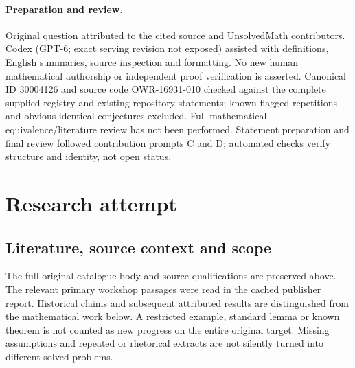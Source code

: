 \documentclass[11pt]{article}
\begin{document}
\paragraph{Preparation and review.}
Original question attributed to the cited source and UnsolvedMath contributors. Codex (GPT-6; exact serving revision not exposed) assisted with definitions, English summaries, source inspection and formatting. No new human mathematical authorship or independent proof verification is asserted. Canonical ID 30004126 and source code OWR-16931-010 checked against the complete supplied registry and existing repository statements; known flagged repetitions and obvious identical conjectures excluded. Full mathematical-equivalence/literature review has not been performed. Statement preparation and final review followed contribution prompts C and D; automated checks verify structure and identity, not open status.
\label{end:30004126}

\section{Research attempt}
\subsection{Literature, source context and scope}
The full original catalogue body and source qualifications are preserved above. The relevant primary workshop passages were read in the cached publisher report. Historical claims and subsequent attributed results are distinguished from the mathematical work below. A restricted example, standard lemma or known theorem is not counted as new progress on the entire original target. Missing assumptions and repeated or rhetorical extracts are not silently turned into different solved problems.
\end{document}
